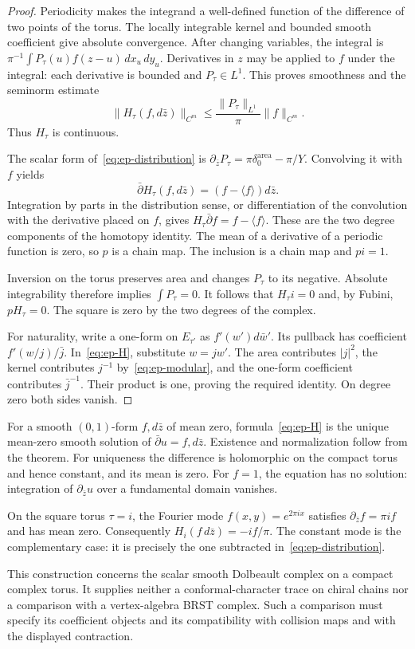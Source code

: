 \begin{proof}
Periodicity makes the integrand a well-defined function of the difference of two points of the torus.
The locally integrable kernel and bounded smooth coefficient give absolute convergence.
After changing variables, the integral is $\pi^{-1}\int P_\tau(u)f(z-u)\,dx_u\,dy_u$.
Derivatives in $z$ may be applied to $f$ under the integral: each derivative is bounded and $P_\tau\in L^1$.
This proves smoothness and the seminorm estimate
\[
 \|H_\tau(f,d\bar z)\|_{C^m}
 \leq\frac{\|P_\tau\|_{L^1}}\pi\|f\|_{C^m}.
\]
Thus $H_\tau$ is continuous.

The scalar form of~\eqref{eq:ep-distribution} is
$\partial_{\bar z}P_\tau=\pi\delta^{\mathrm{area}}_0-\pi/Y$.
Convolving it with $f$ yields
\[
 \bar\partial H_\tau(f,d\bar z)
       =(f-\langle f\rangle)d\bar z.
\]
Integration by parts in the distribution sense, or differentiation of the convolution with the derivative placed on $f$, gives
$H_\tau\bar\partial f=f-\langle f\rangle$.
These are the two degree components of the homotopy identity.
The mean of a derivative of a periodic function is zero, so $p$ is a chain map.
The inclusion is a chain map and $pi=1$.

Inversion on the torus preserves area and changes $P_\tau$ to its negative.
Absolute integrability therefore implies $\int P_\tau=0$.
It follows that $H_\tau i=0$ and, by Fubini, $pH_\tau=0$.
The square is zero by the two degrees of the complex.

For naturality, write a one-form on $E_{\tau'}$ as $f'(w')d\bar w'$.
Its pullback has coefficient $f'(w/j)/\bar j$.
In~\eqref{eq:ep-H}, substitute $w=jw'$.
The area contributes $|j|^2$, the kernel contributes $j^{-1}$ by~\eqref{eq:ep-modular}, and the one-form coefficient contributes $\bar j^{-1}$.
Their product is one, proving the required identity.
On degree zero both sides vanish.
\end{proof}

For a smooth $(0,1)$-form $f,d\bar z$ of mean zero, formula~\eqref{eq:ep-H} is the unique mean-zero smooth solution of $\bar\partial u=f,d\bar z$.
Existence and normalization follow from the theorem.
For uniqueness the difference is holomorphic on the compact torus and hence constant, and its mean is zero.
For $f=1$, the equation has no solution: integration of $\partial_{\bar z}u$ over a fundamental domain vanishes.

On the square torus $\tau=i$, the Fourier mode $f(x,y)=e^{2\pi i x}$ satisfies $\partial_{\bar z}f=\pi i f$ and has mean zero.
Consequently $H_i(f\,d\bar z)=-i f/\pi$.
The constant mode is the complementary case: it is precisely the one subtracted in~\eqref{eq:ep-distribution}.

This construction concerns the scalar smooth Dolbeault complex on a compact complex torus.
It supplies neither a conformal-character trace on chiral chains nor a comparison with a vertex-algebra BRST complex.
Such a comparison must specify its coefficient objects and its compatibility with collision maps and with the displayed contraction.
